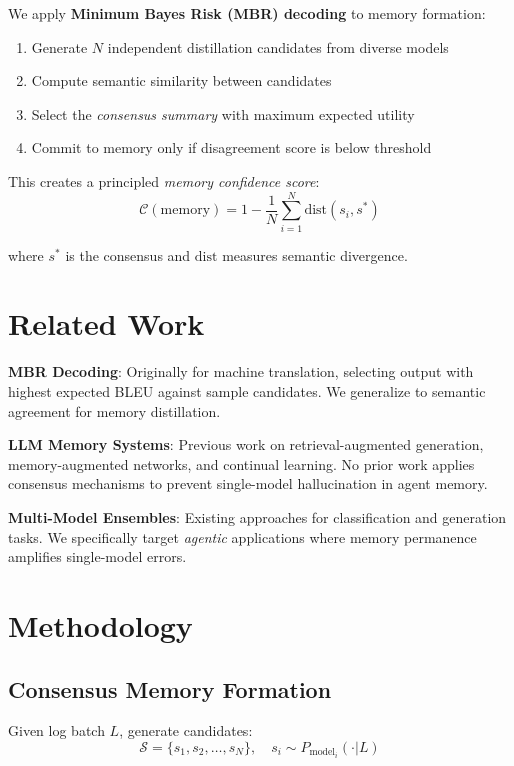 \documentclass[11pt,a4paper]{article}
\begin{document}
We apply \textbf{Minimum Bayes Risk (MBR) decoding} to memory formation:

\begin{enumerate}
  \item Generate $N$ independent distillation candidates from diverse models
  \item Compute semantic similarity between candidates
  \item Select the \emph{consensus summary} with maximum expected utility
  \item Commit to memory only if disagreement score is below threshold
\end{enumerate}

This creates a principled \emph{memory confidence score}:
\[
\mathcal{C}(\text{memory}) = 1 - \frac{1}{N}\sum_{i=1}^N \text{dist}(s_i, s^*)
\]

where $s^*$ is the consensus and $\text{dist}$ measures semantic divergence.

\section{Related Work}

\textbf{MBR Decoding}: Originally for machine translation, selecting 
output with highest expected BLEU against sample candidates. We 
generalize to semantic agreement for memory distillation.

\textbf{LLM Memory Systems}: Previous work on retrieval-augmented 
generation, memory-augmented networks, and continual learning. No 
prior work applies consensus mechanisms to prevent single-model 
hallucination in agent memory.

\textbf{Multi-Model Ensembles}: Existing approaches for classification 
and generation tasks. We specifically target \emph{agentic} applications 
where memory permanence amplifies single-model errors.

\section{Methodology}

\subsection{Consensus Memory Formation}

Given log batch $L$, generate candidates:
\[
\mathcal{S} = \{s_1, s_2, \ldots, s_N\}, \quad s_i \sim P_{\text{model}_i}(\cdot | L)
\]
\end{document}
